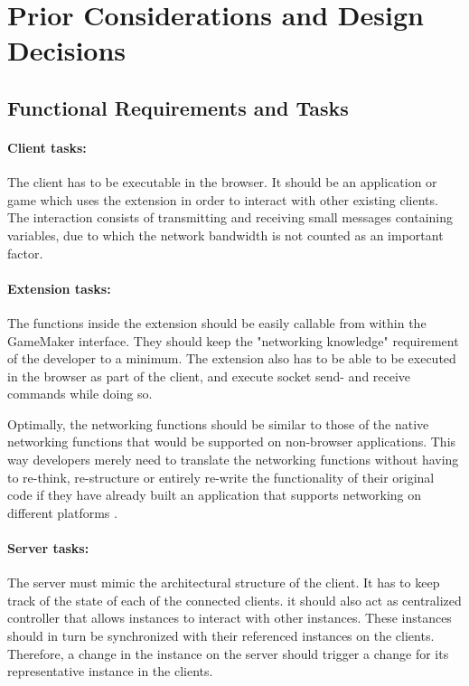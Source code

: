 \documentclass[bsc, 12pt, twoside, singlespacing, parskip, abbrevs, notimes, normalheadings, logo]{styles/infthesis}
\begin{document}
\section{Prior Considerations and Design Decisions}

\subsection{Functional Requirements and Tasks}
\paragraph*{Client tasks:}
The client has to be executable in the browser. It should be an application or game which uses the extension in order to interact with other existing clients. The interaction consists of transmitting and receiving small messages containing variables, due to which the network bandwidth is not counted as an important factor.

\paragraph*{Extension tasks:}
The functions inside the extension should be easily callable from within the GameMaker interface. They should keep the "networking knowledge" requirement of the developer to a minimum. The extension also has to be able to be executed in the browser as part of the client, and execute socket send- and receive commands while doing so.

Optimally, the networking functions should be similar to those of the native networking functions that would be supported on non-browser applications. This way developers merely need to translate the networking functions without having to re-think, re-structure or entirely  re-write the functionality of their original code if they have already built an application that supports networking on different platforms \cite{Software_Engineering}.

\paragraph*{Server tasks:}
The server must mimic the architectural structure of the client. It has to keep track of the state of each of the connected clients. it should also act as centralized controller that allows instances to interact with other instances. These instances should in turn be synchronized with their referenced instances on the clients. Therefore, a change in the instance on the server should trigger a change for its representative instance in the clients.
\end{document}
